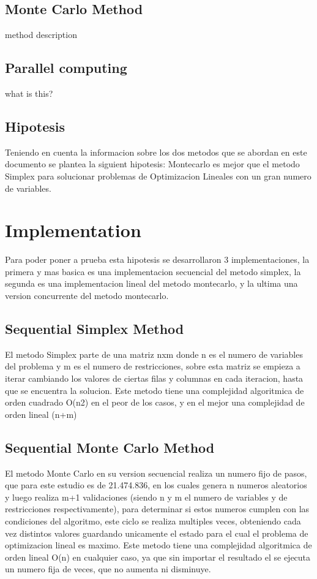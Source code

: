 \documentclass[runningheads]{llncs}
\begin{document}
\subsection{Monte Carlo Method}
method description

\subsection{Parallel computing}
what is this?

\subsection{Hipotesis}
Teniendo en cuenta la informacion sobre los dos metodos que se abordan en este documento se plantea la siguient hipotesis: 
Montecarlo es mejor que el metodo Simplex para solucionar problemas de Optimizacion Lineales con un gran numero de variables.

\section{Implementation}
Para poder poner a prueba esta hipotesis se desarrollaron 3 implementaciones, la primera y mas basica es una implementacion secuencial del metodo simplex, la segunda es una implementacion lineal del metodo montecarlo, y la ultima una version concurrente del metodo montecarlo.

\subsection{Sequential Simplex Method}
El metodo Simplex parte de una matriz nxm donde n es el numero de variables del problema y m es el numero de restricciones, sobre esta matriz se empieza a iterar cambiando los valores de ciertas filas y columnas en cada iteracion, hasta que se encuentra la solucion.
Este metodo tiene una complejidad algoritmica de orden cuadrado O(n2)­ en el peor de los casos, y en el mejor una complejidad de orden lineal (n+m)

\subsection{Sequential Monte Carlo Method}
El metodo Monte Carlo en su version secuencial realiza un numero fijo de pasos, que para este estudio es de 21.474.836, en los cuales genera n numeros aleatorios y luego realiza m+1 validaciones (siendo n y m el numero de variables y de restricciones respectivamente), para determinar si estos numeros cumplen con las condiciones del algoritmo, este ciclo se realiza multiples veces, obteniendo cada vez distintos valores guardando unicamente el estado para el cual el problema de optimizacion lineal es maximo.
Este metodo tiene una complejidad algoritmica de orden lineal O(n) en cualquier caso, ya que sin importar el resultado el se ejecuta un numero fija de veces, que no aumenta ni disminuye. 
\end{document}
